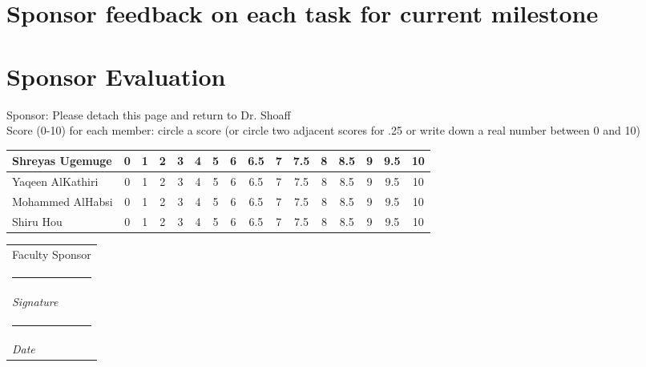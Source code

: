 \documentclass[12pt]{article}
\makeatletter
\newcommand{\namesigdate}[2][5cm]{%
  \begin{tabular}{@{}p{#1}@{}}
    #2 \\[2\normalbaselineskip] \hrule \\[0pt]
    {\small \textit{Signature}} \\ [2\normalbaselineskip] \hrule \\[0pt]
    {\small \textit{Date}}
  \end{tabular}
}
\makeatother
\begin{document}
	\pagebreak
	\section{Sponsor feedback on each task for current milestone}
	\pagebreak
	\section{Sponsor Evaluation}
	Sponsor: Please detach this page and return to Dr. Shoaff \\ \hfill \break 
	Score (0-10) for each member: circle a score (or circle two adjacent scores for .25 or write down a real number between 0 and 10) \\ \hfill \break
	\begin{tabularx}{\textwidth}{|X|c|c|c|c|c|c|c|c|c|c|c|c|c|c|c|}
	\hline
	Shreyas Ugemuge & 0 & 1 &  2 & 3 & 4 & 5 & 6 & 6.5 & 7 & 7.5 & 8 & 8.5 & 9 & 9.5 & 10 \\ \hline
	Yaqeen AlKathiri & 0 & 1 &  2 & 3 & 4 & 5 & 6 & 6.5 & 7 & 7.5 & 8 & 8.5 & 9 & 9.5 & 10 \\ \hline
	Mohammed AlHabsi & 0 & 1 &  2 & 3 & 4 & 5 & 6 & 6.5 & 7 & 7.5 & 8 & 8.5 & 9 & 9.5 & 10 \\ \hline
	Shiru Hou & 0 & 1 &  2 & 3 & 4 & 5 & 6 & 6.5 & 7 & 7.5 & 8 & 8.5 & 9 & 9.5 & 10 \\ 
	\hline 
	\end{tabularx}
	\hfil \break
	\hfil \break
	\namesigdate{Faculty Sponsor}
	
\end{document}
